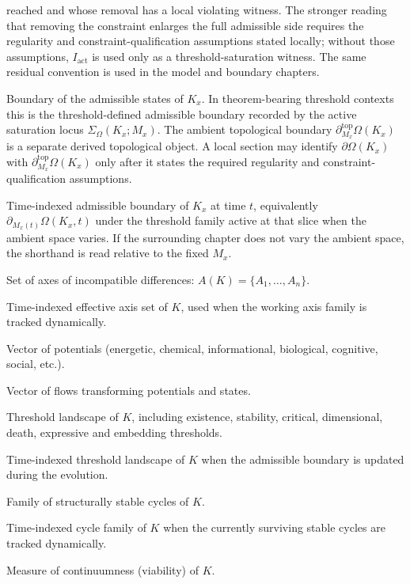 \begin{description}
        reached and whose removal has a local violating witness. The stronger
        reading that removing the constraint enlarges the full admissible side
        requires the regularity and constraint-qualification assumptions stated
        locally; without those assumptions, \(I_{\mathrm{act}}\) is used only as
        a threshold-saturation witness. The same residual convention is used in
        the model and boundary chapters.
  \item[\(\partial\Omega(K_x)\)] Boundary of the admissible states of \(K_x\).
        In theorem-bearing threshold contexts this is the threshold-defined
        admissible boundary recorded by the active saturation locus
        \(\Sigma_{\Omega}(K_x;M_x)\). The ambient topological boundary
        \(\partial_{M_x}^{\mathrm{top}}\Omega(K_x)\) is a separate derived
        topological object. A local section may identify
        \(\partial\Omega(K_x)\) with
        \(\partial_{M_x}^{\mathrm{top}}\Omega(K_x)\) only after it states the
        required regularity and constraint-qualification assumptions.
  \item[\(\partial\Omega(K_x,t)\)] Time-indexed admissible boundary of \(K_x\)
        at time \(t\), equivalently \(\partial_{M_x(t)}\Omega(K_x,t)\) under
        the threshold family active at that slice when the ambient space
        varies. If the surrounding chapter does not vary the ambient space, the
        shorthand is read relative to the fixed \(M_x\).
  \item[\(A(K)\)] Set of axes of incompatible differences:
        \(A(K) = \{A_1,\dots,A_n\}\).
  \item[\(A(K,t)\)] Time-indexed effective axis set of \(K\), used when the
        working axis family is tracked dynamically.
  \item[\(P(t)\)] Vector of potentials (energetic, chemical, informational,
        biological, cognitive, social, etc.).
  \item[\(J(t)\)] Vector of flows transforming potentials and states.
  \item[\(\Theta(K)\)] Threshold landscape of \(K\), including existence,
        stability, critical, dimensional, death, expressive and embedding
        thresholds.
  \item[\(\Theta(K,t)\)] Time-indexed threshold landscape of \(K\) when the
        admissible boundary is updated during the evolution.
  \item[\(C(K)\)] Family of structurally stable cycles of \(K\).
  \item[\(C(K,t)\)] Time-indexed cycle family of \(K\) when the currently
        surviving stable cycles are tracked dynamically.
  \item[\(k(K,t)\)] Measure of continuumness (viability) of \(K\).
\end{description}

